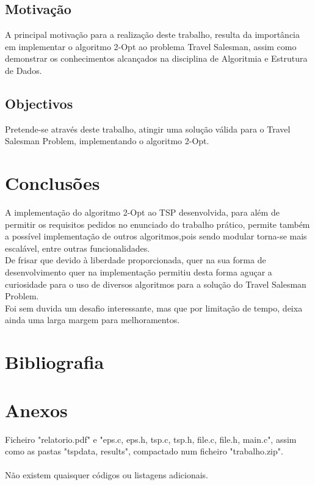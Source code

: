 \documentclass[12pt,a4paper,portrait]{article}
\begin{document}
		\subsection{Motivação}
			A principal motivação para a realização deste trabalho, resulta da importância em implementar o algoritmo 2-Opt ao problema Travel Salesman, assim como demonstrar os conhecimentos alcançados na disciplina de Algoritmia e Estrutura de Dados.\\
		\subsection{Objectivos}
			Pretende-se através deste trabalho, atingir uma solução válida para o Travel Salesman Problem, implementando o algoritmo 2-Opt.\\
	\section{Conclusões}
		A implementação do algoritmo 2-Opt ao TSP desenvolvida, para além de permitir os requisitos pedidos no enunciado do trabalho prático, permite também a possível implementação de outros algoritmos,pois sendo modular torna-se mais escalável, entre outras funcionalidades.\\
		De frisar que devido à liberdade proporcionada, quer na sua forma de desenvolvimento quer na implementação permitiu desta forma aguçar a curiosidade para o uso de diversos algoritmos para a solução do Travel Salesman Problem.\\
		Foi sem duvida um desafio interessante, mas que por limitação de tempo, deixa ainda uma larga margem para melhoramentos.\\
	\newpage
	\section{Bibliografia}
	
	

	\newpage
	\section{Anexos}
		Ficheiro "relatorio.pdf" e "eps.c, eps.h, tsp.c, tsp.h, file.c, file.h, main.c", assim como as pastas "tspdata, results", compactado num ficheiro "trabalho.zip".\\\\
		Não existem quaisquer códigos ou listagens adicionais.\\					
\end{document}
